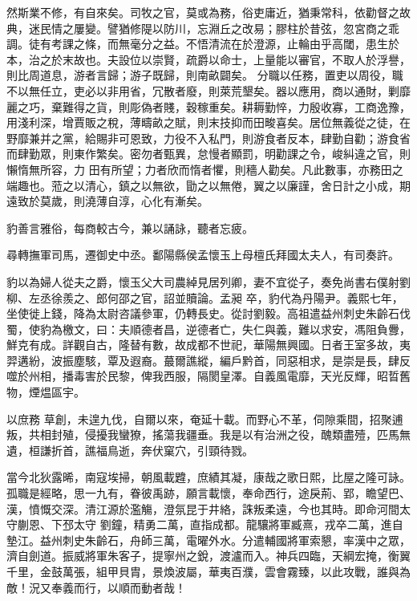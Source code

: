 \begin{pinyinscope}
 然斯業不修，有自來矣。司牧之官，莫或為務，俗吏庸近，猶秉常科，依勸督之故典，迷民情之屢變。譬猶修隄以防川，忘淵丘之改易；膠柱於昔弦，忽宮商之乖調。徒有考課之條，而無毫分之益。不悟清流在於澄源，止輪由乎高閾，患生於本，治之於末故也。夫設位以崇賢，疏爵以命士，上量能以審官，不取人於浮譽，則比周道息，游者言歸；游子既歸，則南畝闢矣。
 分職以任務，置吏以周役，職不以無任立，吏必以非用省，冗散者廢，則萊荒墾矣。器以應用，商以通財，剿靡麗之巧，棄難得之貨，則彫偽者賤，穀稼重矣。耕耨勤悴，力殷收寡，工商逸豫，用淺利深，增賈販之稅，薄疇畝之賦，則末技抑而田畯喜矣。居位無義從之徒，在野靡兼并之黨，給賜非可恩致，力役不入私門，則游食者反本，肆勤自勸；游食省而肆勤眾，則東作繁矣。密勿者甄異，怠慢者顯罰，明勸課之令，峻糾違之官，則懶惰無所容，力
 田有所望；力者欣而惰者懼，則穡人勸矣。凡此數事，亦務田之端趣也。蒞之以清心，鎮之以無欲，勖之以無倦，翼之以廉謹，舍日計之小成，期遠致於莫歲，則澆薄自淳，心化有漸矣。



 豹善言雅俗，每商較古今，兼以誦詠，聽者忘疲。



 尋轉撫軍司馬，遷御史中丞。鄱陽縣侯孟懷玉上母檀氏拜國太夫人，有司奏許。



 豹以為婦人從夫之爵，懷玉父大司農綽見居列卿，妻不宜從子，奏免尚書右僕射劉柳、左丞徐羨之、郎何邵之官，詔並贖論。孟昶
 卒，豹代為丹陽尹。義熙七年，坐使徙上錢，降為太尉咨議參軍，仍轉長史。從討劉毅。高祖遣益州刺史朱齡石伐蜀，使豹為檄文，曰：夫順德者昌，逆德者亡，失仁與義，難以求安，馮阻負釁，鮮克有成。詳觀自古，隆替有數，故成都不世祀，華陽無興國。日者王室多故，夷羿遘紛，波振塵駭，覃及遐裔。蕞爾譙縱，編戶黔首，同惡相求，是崇是長，肆反噬於州相，播毒害於民黎，俾我西服，隔閡皇澤。自義風電靡，天光反輝，昭晢舊物，煙煴區宇。



 以庶務
 草創，未遑九伐，自爾以來，奄延十載。而野心不革，伺隙乘間，招聚逋叛，共相封殖，侵擾我蠻獠，搖蕩我疆垂。我是以有治洲之役，醜類盡殪，匹馬無遺，桓謙折首，譙福鳥逝，奔伏窠穴，引頸待戮。



 當今北狄露晞，南寇埃掃，朝風載韙，庶績其凝，康哉之歌日熙，比屋之隆可詠。孤職是經略，思一九有，眷彼禹跡，願言載懷，奉命西行，途戾荊、郢，瞻望巴、漢，憤慨交深。清江源於濫觴，澄氛昆于井絡，誅叛柔遠，今也其時。即命河間太守蒯恩、下邳太守
 劉鐘，精勇二萬，直指成都。龍驤將軍臧熹，戎卒二萬，進自墊江。益州刺史朱齡石，舟師三萬，電曜外水。分遣輔國將軍索懇，率漢中之眾，濟自劍道。振威將軍朱客子，提寧州之銳，渡瀘而入。神兵四臨，天綱宏掩，衡翼千里，金鼓萬張，組甲貝胄，景煥波屬，華夷百濮，雲會霧臻，以此攻戰，誰與為敵！況又奉義而行，以順而動者哉！




\end{pinyinscope}
